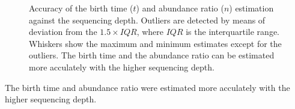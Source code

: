 \documentclass{article}
\begin{document}
\begin{figure}[H]
   \caption{
 Accuracy of the birth time ($t$) and abundance ratio ($n$) estimation against the sequencing depth. Outliers are detected by means of deviation from the $1.5 \times IQR$, where $IQR$ is the interquartile range. Whiskers show the maximum and minimum estimates except for the outliers. The birth time and the abundance ratio can be estimated more acculately with the higher sequencing depth.
  }
 \label{fig: read_emission_coverage}
\end{figure}

The birth time and abundance ratio were estimated more acculately with the higher sequencing depth.
\end{document}
